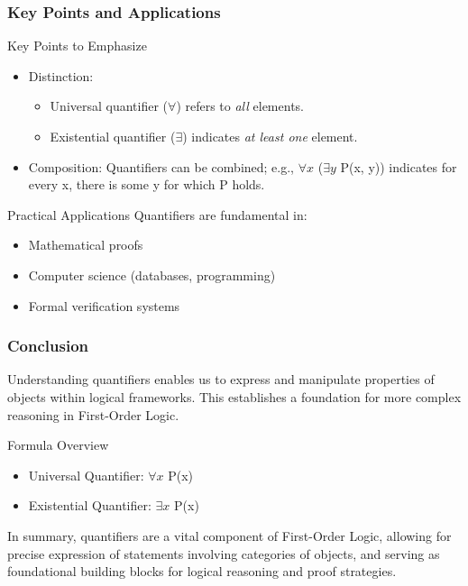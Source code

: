 \documentclass[aspectratio=169]{beamer}
\begin{document}
\begin{frame}[fragile]
    \frametitle{Key Points and Applications}
    \begin{block}{Key Points to Emphasize}
        \begin{itemize}
            \item Distinction:
            \begin{itemize}
                \item Universal quantifier ($\forall$) refers to \textit{all} elements.
                \item Existential quantifier ($\exists$) indicates \textit{at least one} element.
            \end{itemize}
            \item Composition: Quantifiers can be combined; e.g., $\forall x$ ($\exists y$ P(x, y)) indicates for every x, there is some y for which P holds.
        \end{itemize}
    \end{block}

    \begin{block}{Practical Applications}
        Quantifiers are fundamental in:
        \begin{itemize}
            \item Mathematical proofs
            \item Computer science (databases, programming)
            \item Formal verification systems
        \end{itemize}
    \end{block}
\end{frame}

\begin{frame}[fragile]
    \frametitle{Conclusion}
    Understanding quantifiers enables us to express and manipulate properties of objects within logical frameworks. This establishes a foundation for more complex reasoning in First-Order Logic.
    
    \begin{block}{Formula Overview}
        \begin{itemize}
            \item Universal Quantifier: $\forall x$ P(x)
            \item Existential Quantifier: $\exists x$ P(x)
        \end{itemize}
    \end{block}
    
    In summary, quantifiers are a vital component of First-Order Logic, allowing for precise expression of statements involving categories of objects, and serving as foundational building blocks for logical reasoning and proof strategies.
\end{frame}
\end{document}
